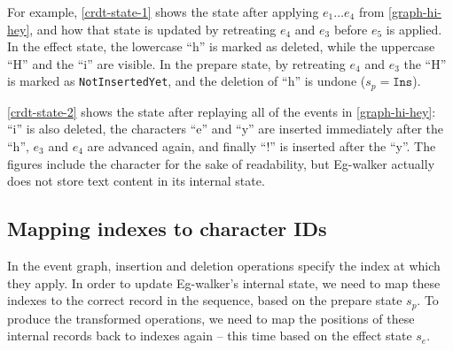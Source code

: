 \documentclass[sigplan,10pt]{acmart}
\newcommand{\algname}{Eg-walker\xspace}
\begin{document}
For example, \autoref{crdt-state-1} shows the state after applying $e_1 \dots e_4$ from \autoref{graph-hi-hey}, and how that state is updated by retreating $e_4$ and $e_3$ before $e_5$ is applied.
In the effect state, the lowercase ``h'' is marked as deleted, while the uppercase ``H'' and the ``i'' are visible.
In the prepare state, by retreating $e_4$ and $e_3$ the ``H'' is marked as \texttt{NotInsertedYet}, and the deletion of ``h'' is undone ($s_p = \texttt{Ins}$).


\autoref{crdt-state-2} shows the state after replaying all of the events in \autoref{graph-hi-hey}: ``i'' is also deleted, the characters ``e'' and ``y'' are inserted immediately after the ``h'', $e_3$ and $e_4$ are advanced again, and finally ``!'' is inserted after the ``y''.
The figures include the character for the sake of readability, but \algname actually does not store text content in its internal state.

\subsection{Mapping indexes to character IDs}

In the event graph, insertion and deletion operations specify the index at which they apply.
In order to update \algname's internal state, we need to map these indexes to the correct record in the sequence, based on the prepare state $s_p$.
To produce the transformed operations, we need to map the positions of these internal records back to indexes again -- this time based on the effect state $s_e$.
\end{document}
